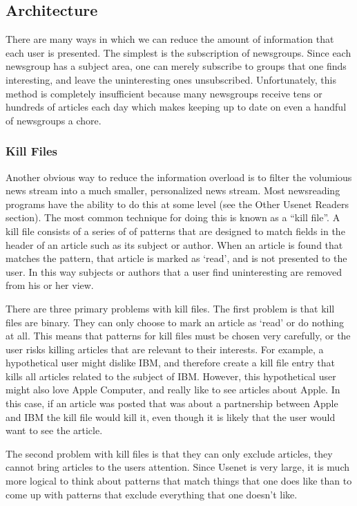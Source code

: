 \subsection{Architecture}

There are many ways in which we can reduce the amount of information that each
user is presented. The simplest is the subscription of newsgroups. Since each
newsgroup has a subject area, one can merely subscribe to groups that one finds
interesting, and leave the uninteresting ones unsubscribed. Unfortunately, this
method is completely insufficient because many newsgroups receive tens or
hundreds of articles each day which makes keeping up to date on even a handful
of newsgroups a chore.

\subsubsection{Kill Files}

Another obvious way to reduce the information overload is to filter the
volumious news stream into a much smaller, personalized news stream. Most
newsreading programs have the ability to do this at some level (see the Other
Usenet Readers section). The most common technique for doing this is known as a
``kill file''. A kill file consists of a series of of patterns that are
designed to match fields in the header of an article such as its subject or
author. When an article is found that matches the pattern, that article is
marked as `read', and is not presented to the user. In this way subjects or
authors that a user find uninteresting are removed from his or her view.

There are three primary problems with kill files. The first problem is that
kill files are binary. They can only choose to mark an article as `read' or do
nothing at all. This means that patterns for kill files must be chosen very
carefully, or the user risks killing articles that are relevant to their
interests. For example, a hypothetical user might dislike IBM, and therefore
create a kill file entry that kills all articles related to the subject of IBM.
However, this hypothetical user might also love Apple Computer, and really like
to see articles about Apple. In this case, if an article was posted that was
about a partnership between Apple and IBM the kill file would kill it, even
though it is likely that the user would want to see the article.

The second problem with kill files is that they can only exclude articles, they
cannot bring articles to the users attention. Since Usenet is very large, it is
much more logical to think about patterns that match things that one does like
than to come up with patterns that exclude everything that one doesn't like.

